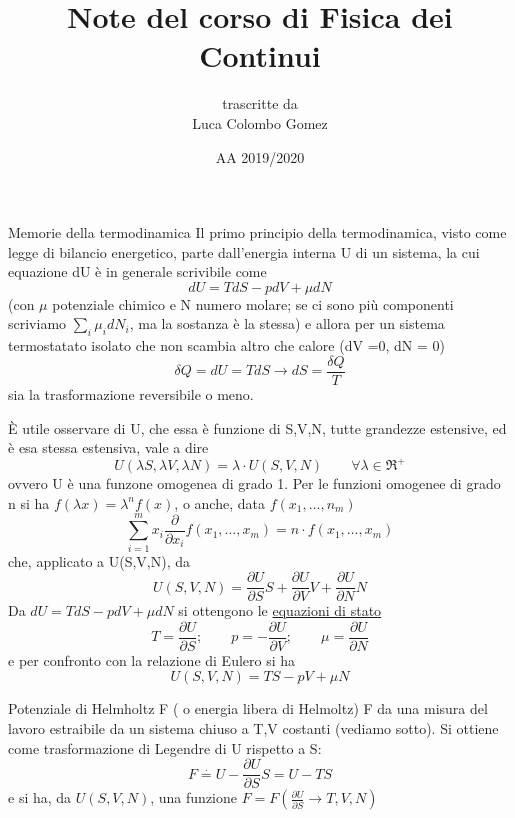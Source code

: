 \documentclass[a4paper,11pt]{report}
\title{Note del corso di Fisica dei Continui}
\author{trascritte da \\Luca Colombo Gomez}
\date{AA 2019/2020}
\newcommand{\eacc}{È }
\begin{document}
	\titlepage
	\maketitle
	\tableofcontents
	
	\begin{chapter}{Memorie della termodinamica}
		Il primo principio della termodinamica, visto come legge di bilancio energetico, parte dall'energia interna U di un sistema, la cui equazione dU è in generale scrivibile come
		$$dU = TdS - pdV + \mu dN $$
		(con $\mu$ potenziale chimico e N numero molare; se ci sono più componenti scriviamo $\sum_i \mu_i dN_i $, ma la sostanza è la stessa)
		e allora per un sistema termostatato isolato che non scambia altro che calore (dV =0, dN = 0)
		$$
		\delta Q = dU = TdS \rightarrow dS = \dfrac{\delta Q}{T}
		$$
		sia la trasformazione reversibile o meno.
		
		\eacc utile osservare di U, che essa è funzione di S,V,N, tutte grandezze estensive, ed è esa stessa estensiva, vale a dire 
		\begin{equation}
			U(\lambda S, \lambda V, \lambda N) = \lambda \cdot U(S,V,N) \qquad \forall \lambda \in \Re^+
		\end{equation}
		ovvero U è una funzone omogenea di grado 1. Per le funzioni omogenee di grado n si ha $f(\lambda x) = \lambda ^n f(x)$, o anche, data $f(x_1,\dots, n_m)$
		\begin{equation}
			\sum_{i=1}^{m}x_i \dfrac{\partial}{\partial x_i} f(x_1, \dots, x_m) = n \cdot f(x_1, \dots, x_m)
		\end{equation}
		che, applicato a U(S,V,N), da
		\begin{equation}
			U(S,V,N) = \dfrac{\partial U}{\partial S} S + \dfrac{\partial U}{\partial V} V + \dfrac{\partial U}{\partial N} N
		\end{equation}
		Da $dU = TdS -pdV + \mu dN$ si ottengono le \underline{equazioni di stato}
		\begin{equation}
			T=\dfrac{\partial U}{\partial S}; \qquad p = - \dfrac{\partial U}{\partial V}; \qquad \mu = \dfrac{\partial U}{\partial N}
		\end{equation}
		e per confronto con la relazione di Eulero si ha
		\begin{equation}
			U(S,V,N)=TS-pV+\mu N
		\end{equation}
		\begin{section}{Potenziale di Helmholtz F ( o energia libera di Helmoltz)}
			F da una misura del lavoro estraibile da un sistema chiuso a T,V costanti (vediamo sotto).
			Si ottiene come trasformazione di Legendre di U rispetto a S:
			\begin{equation}
				F \overset{\cdot}{=} U- \dfrac{\partial U}{\partial S} S = U-TS
			\end{equation}
			e si ha, da $U(S,V,N)$, una funzione $F = F(\frac{\partial U}{\partial S} \rightarrow T, V,N)$
			

\end{section}
\end{chapter}
\end{document}
